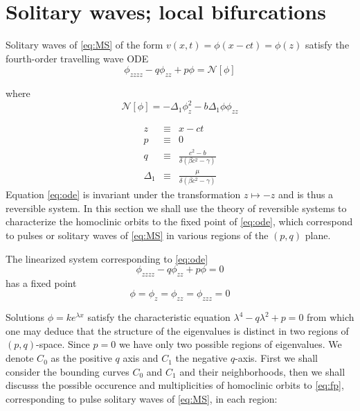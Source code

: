 \section{Solitary waves; local bifurcations}


Solitary waves of \eqref{eq:MS} of the form 
$v(x,t) = \phi\left(x - c t\right) = \phi\left(z\right)$
 satisfy the fourth-order travelling wave ODE
\begin{equation} \label{eq:ode} \phi_{zzzz} - q \phi_{zz} + p \phi = \mathcal{N}[\phi]
\end{equation}

where 
\begin{equation}
\mathcal{N}\left[\phi\right] = -\Delta_1 \phi_z^2 - b \Delta_1 \phi \phi_{zz}
\end{equation}

\begin{subequations}
\begin{eqnarray}
z &\equiv& x - c t\\
p &\equiv& 0\label{eq:pdef} \\
q &\equiv & \frac{c^2 - b}{\delta\left(\beta c^2 - \gamma\right)} 
\label{eq:qdef} \\
\Delta_1 &\equiv& \frac{\mu}{ \delta\left( \beta c^2 - \gamma\right) }\label{eq:deltadef} 
\end{eqnarray}
\end{subequations}
Equation \eqref{eq:ode} is invariant under the transformation $ z \mapsto -z $ and is thus a reversible system. In this section we shall
use the theory of reversible systems to characterize the homoclinic orbits to the fixed point of \eqref{eq:ode}, which correspond to pulses
or solitary waves of \eqref{eq:MS} in various regions of the $(p,q)$ plane.

The linearized system corresponding to \eqref{eq:ode}
\begin{equation}
 \label{eq:linode} \phi_{zzzz} - q \phi_{zz} + p \phi = 0
\end{equation}
has a fixed point \begin{equation}\label{eq:fp} \phi = \phi_z = \phi_{zz} = \phi_{zzz} = 0 \end{equation}

Solutions $\phi = k e^{\lambda x}$ satisfy the characteristic equation
$\lambda^4 - q \lambda^2 + p = 0 $ from which one may deduce that the structure
of the eigenvalues is distinct in two regions of $\left(p,q\right)$-space.
Since $p=0$ we have only two possible regions of eigenvalues.  We denote $C_0$
as the positive $q$ axis and $C_1$ the negative $q$-axis. First we shall 
consider the bounding curves $C_0$ and $C_1$ and their neighborhoods, then we shall discusss the possible
occurence and multiplicities of homoclinic orbits to \eqref{eq:fp}, corresponding
to pulse solitary waves of \eqref{eq:MS}, in each region:

